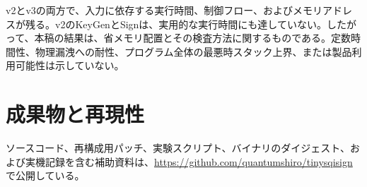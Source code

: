 \documentclass[a4paper,10pt]{ltjsarticle}
\theoremstyle{definition}
\theoremstyle{remark}
\begin{document}
v2とv3の両方で、入力に依存する実行時間、制御フロー、およびメモリアドレスが残る。v2のKeyGenとSignは、実用的な実行時間にも達していない。したがって、本稿の結果は、省メモリ配置とその検査方法に関するものである。定数時間性、物理漏洩への耐性、プログラム全体の最悪時スタック上界、または製品利用可能性は示していない。

\section*{成果物と再現性}

ソースコード、再構成用パッチ、実験スクリプト、バイナリのダイジェスト、および実機記録を含む補助資料は、\url{https://github.com/quantumshiro/tinysqisign}で公開している。

\printbibliography[title={参考文献}]
\end{document}

